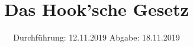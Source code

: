 

\subject{Versuch 803}
\title{Das Hook'sche Gesetz}
\date{%
  Durchführung: 12.11.2019
  \hspace{3em}
  Abgabe: 18.11.2019
}



\maketitle
\thispagestyle{empty}
\tableofcontents
\newpage








\printbibliography{}


